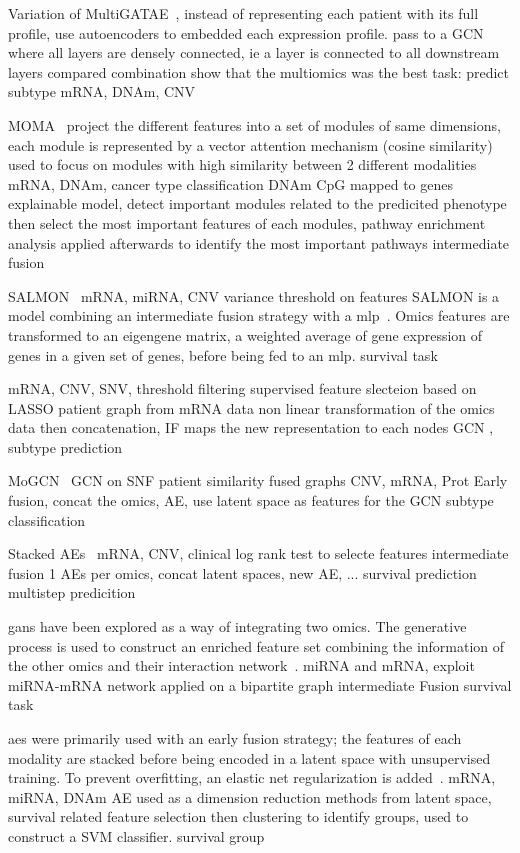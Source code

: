 \documentclass[../main.tex]{subfiles}
\begin{document}
	Variation of MultiGATAE~\cite{Zhang2022}, instead of representing each patient with its full profile, use autoencoders to embedded each expression profile. 
	pass to a GCN where all layers are densely connected, ie a layer is connected to all downstream layers 
	compared combination show that the multiomics was the best 
	task: predict subtype 
	mRNA, DNAm, CNV

	MOMA~\cite{MOMA}
	project the different features into a set of modules of same dimensions, each module is represented by a vector 
	attention mechanism (cosine similarity) used to focus on modules with high similarity between 2 different modalities 
	mRNA, DNAm, cancer type classification
	DNAm CpG mapped to genes 
	explainable model, detect important modules related to the predicited phenotype then select the most important features of each modules, pathway enrichment analysis applied afterwards to identify the most important pathways 
	intermediate fusion 

	SALMON~\cite{SALMON} mRNA, miRNA, CNV 
	variance threshold on features 
	SALMON is a model combining an intermediate fusion strategy with a \gls{mlp}~\cite{SALMON}. 
	Omics features are transformed to an eigengene matrix, a weighted average of gene expression of genes in a given set of genes, before being fed to an \gls{mlp}.
	survival task 

	\cite{Yin2022} mRNA, CNV, SNV, 
	threshold filtering 
	supervised feature slecteion based on LASSO
	patient graph from mRNA data 
	non linear transformation of the omics data then concatenation, IF 
	maps the new representation to each nodes 
	GCN , subtype prediction 

	MoGCN~\cite{MoGCN} GCN on SNF patient similarity fused graphs 
	CNV, mRNA, Prot
	Early fusion, concat the omics, AE, use latent space as features for the GCN subtype classification

	Stacked AEs~\cite{Wu2022StackedAB}
	mRNA, CNV, clinical 
	log rank test to selecte features 
	intermediate fusion
	1 AEs per omics, concat latent spaces, new AE, ...
	survival prediction 
	multistep predicition

	\Glspl{gan} have been explored as a way of integrating two omics.
The generative process is used to construct an enriched feature set combining the information of the other omics and their interaction network~\cite{omicsGAN}. 
miRNA and mRNA, exploit miRNA-mRNA network 
applied on a bipartite graph intermediate Fusion 
survival task 

\glspl{ae} were primarily used with an early fusion strategy; the features of each modality are stacked before being encoded in a latent space with unsupervised training.
To prevent overfitting, an elastic net regularization is added~\cite{Chaudhary2018}.
mRNA, miRNA, DNAm
AE used as a dimension reduction methods 
from latent space, survival related feature selection then clustering to identify groups, used to construct a SVM classifier.
survival group
\end{document}
